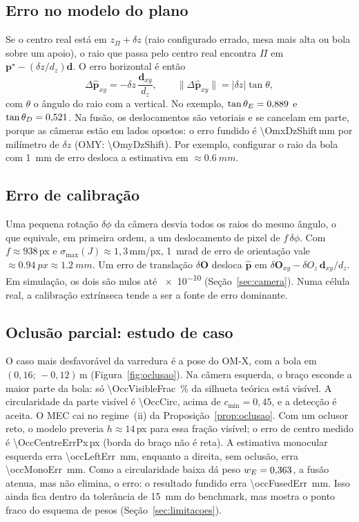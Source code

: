 \documentclass[11pt,a4paper]{article}
\theoremstyle{definition}
\theoremstyle{remark}
\newcommand{\vect}[1]{\bm{#1}}
\newcommand{\code}[1]{\texttt{\detokenize{#1}}}
\begin{document}
\subsection{Erro no modelo do plano}

Se o centro real está em $z_\Pi+\delta z$ (raio configurado errado, mesa mais
alta ou bola sobre um apoio), o raio que passa pelo centro real encontra $\Pi$
em $\vect p^\star-(\delta z/d_z)\vect d$. O erro horizontal é então
\begin{equation}
\Delta\hat{\vect p}_{xy}=-\delta z\,\frac{\vect d_{xy}}{d_z},\qquad
\|\Delta\hat{\vect p}_{xy}\|=|\delta z|\tan\theta,
\end{equation}
com $\theta$ o ângulo do raio com a vertical. No exemplo, $\tan\theta_E=
\num{0.889}$ e $\tan\theta_D=\num{0.521}$. Na fusão, os
deslocamentos são vetoriais e se cancelam em parte, porque as câmeras estão em
lados opostos: o erro fundido é \num{\OmxDzShift}\,mm por milímetro de $\delta z$
(OMY: \num{\OmyDzShift}). Por exemplo, configurar o raio da bola com
\SI{1}{mm} de erro desloca a estimativa em $\approx\SI{0.6}{mm}$.

\subsection{Erro de calibração}

Uma pequena rotação $\delta\phi$ da câmera desvia todos os raios do mesmo
ângulo, o que equivale, em primeira ordem, a um deslocamento de pixel de
$f\,\delta\phi$. Com $f\approx\num{938}$\,px e $\sigma_{\max}(J)\approx1{,}3$\,mm/px,
\SI{1}{mrad} de erro de orientação vale $\approx\SI{0.94}{px}\approx\SI{1.2}{mm}$.
Um erro de translação $\delta\vect O$ desloca $\hat{\vect p}$ em
$\delta\vect O_{xy}-\delta O_z\,\vect d_{xy}/d_z$. Em simulação, os dois são
nulos até \num{e-10} (Seção~\ref{sec:camera}). Numa célula real, a calibração
extrínseca tende a ser a fonte de erro dominante.

\subsection{Oclusão parcial: estudo de caso}
\label{sec:oclusao-caso}

O caso mais desfavorável da varredura é a pose
\code{mid_backish} do OM-X, com a bola em $(0{,}16;\,-0{,}12)$\,m (Figura~\ref{fig:oclusao}). Na câmera
esquerda, o braço esconde a maior parte da bola: só
\SI{\OccVisibleFrac}{\percent} da silhueta teórica está visível. A circularidade
da parte visível é \num{\OccCirc}, acima de $c_{\min}=0{,}45$, e a detecção é
aceita. O MEC cai no regime~(ii) da Proposição~\ref{prop:oclusao}. Com um
oclusor reto, o modelo preveria $h\approx14$\,px para essa fração visível; o
erro de centro medido é \num{\OccCentreErrPx}\,px (borda do braço não é reta).
A estimativa monocular esquerda erra \SI{\occLeftErr}{mm}, enquanto a direita,
sem oclusão, erra \SI{\occMonoErr}{mm}. Como a circularidade baixa dá peso
$w_E=\num{0.363}$, a fusão atenua, mas não elimina, o erro: o resultado
fundido erra \SI{\occFusedErr}{mm}. Isso ainda fica dentro da tolerância de
\SI{15}{mm} do benchmark, mas mostra o ponto fraco do esquema de pesos
(Seção~\ref{sec:limitacoes}).
\end{document}

